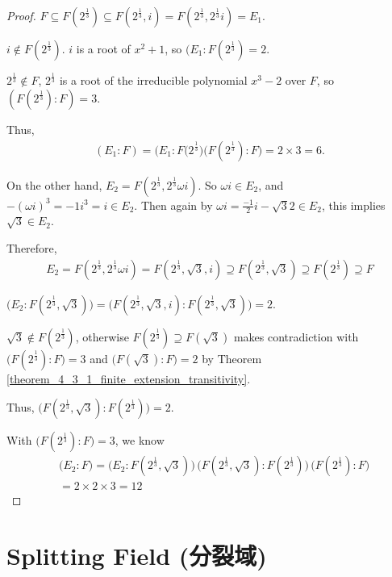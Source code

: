 \documentclass[utf8]{ctexbook}
\begin{document}
\begin{proof}
$F \subseteq F(2^{\frac{1}{3}}) \subseteq F(2^{\frac{1}{3}}, i) = F(2^{\frac{1}{3}}, 2^{\frac{1}{3}} i) = E_1$.

$i \not \in F(2^{\frac{1}{3}})$. $i $ is a root of $x^2 + 1$, so $(E_1: F(2^{\frac{1}{3}}) = 2$.

$2^{\frac{1}{3}} \not \in F$, $2^{\frac{1}{3}}$ is a root of the irreducible polynomial $x^3 -2$ over $F$, so $(F(2^{\frac{1}{3}}): F) = 3$.

Thus,
\begin{align*}
(E_1 :F) = \big( E_1: F(2^{\frac{1}{3}} \big) \big( F(2^{\frac{1}{3}}): F \big) = 2 \times 3 = 6 .
\end{align*}

On the other hand, $E_2 = F(2^{\frac{1}{3}}, 2^{\frac{1}{3}} \omega i)$. So $\omega i \in E_2$, and $- (\omega i )^3 = - 1 i^3 = i \in E_2$. Then again by $\omega i = \frac{-1}{2} i - \sqrt{3}{2} \in E_2$, this implies $\sqrt{3} \in E_2$. 

Therefore,
\begin{align*}
E_2 = F(2^{\frac{1}{3}}, 2^{\frac{1}{3}} \omega i) = F(2^{\frac{1}{3}}, \sqrt{3}, i) \supseteq F(2^{\frac{1}{3}}, \sqrt{3}) \supseteq F(2^{\frac{1}{3}}) \supseteq F
\end{align*}

$\big( E_2 : F(2^{\frac{1}{3}}, \sqrt{3}) \big) = \big( F(2^{\frac{1}{3}}, \sqrt{3}, i) :  F(2^{\frac{1}{3}}, \sqrt{3})  \big)  = 2$.

$\sqrt{3} \not \in F(2^{\frac{1}{3}}) $, otherwise $F(2^{\frac{1}{3}}) \supseteq F(\sqrt{3})  $ makes contradiction with $ \big( F(2^{\frac{1}{3}}) : F \big) = 3$ and $ \big( F(\sqrt{3}) : F \big) = 2$ by Theorem \ref{theorem_4_3_1_finite_extension_transitivity}.

Thus, $\big( F(2^{\frac{1}{3}}, \sqrt{3}) :  F(2^{\frac{1}{3}})  \big) = 2$.

With $\big( F(2^{\frac{1}{3}}) : F \big) = 3$, we know
\begin{align*}
& \big( E_2 : F \big) = \big( E_2 : F(2^{\frac{1}{3}}, \sqrt{3}) \big) \, \big( F(2^{\frac{1}{3}}, \sqrt{3}) :  F(2^{\frac{1}{3}})  \big) \, \big( F(2^{\frac{1}{3}}) : F \big) \\
& = 2 \times 2 \times 3 = 12
\end{align*}

\end{proof}

\section{Splitting Field (分裂域)}
\end{document}
